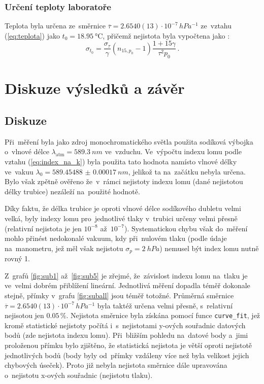 \documentclass{../concepts/titul_zprava_p/prepareprotokolZprava} %
\begin{document}
\subsubsection{Určení teploty laboratoře}

Teplota byla určena ze~směrnice $\overline{\tau} = 2.6540(13)\cdot10^{-7}\,\unit{hPa^{-1}}$ ze~vztahu (\ref{eq:teplota})
jako $t_0 = \qty{18.95}{\degreeCelsius}$, přičemž nejistota byla vypočtena jako \cite{englich}:
\begin{equation}
    \label{eq:sigma_teplota}
    \sigma_{t_0} = \frac{\sigma_\tau}{\gamma} \left( n_{15,p_0} - 1 \right) \frac{1+15\gamma}{\tau^2 p_0} \,.
\end{equation}


\section{Diskuze výsledků a závěr}
\subsection{Diskuze}
Při~měření byla jako zdroj monochromatického světla použita sodíková výbojka o~vlnové délce $\lambda_\mathrm{atm} = \qty{589.3}{nm}$
ve~vzduchu. Ve~výpočtu indexu lomu podle vztahu (\ref{eq:index_na_k}) byla použita tato hodnota namísto vlnové délky ve~vakuu
$\lambda_0 = \qty{589.45488(17)}{nm}$, jelikož ta na~začátku nebyla určena. Bylo však zpětně ověřeno že~v~rámci nejistoty indexu 
lomu (dané nejistotou délky trubice) nezáleží na~použité hodnotě.

Díky faktu, že délka trubice je oproti vlnové délce sodíkového dubletu velmi velká, byly indexy lomu pro~jednotlivé tlaky v~trubici
určeny velmi přesně (relativní nejistota je jen $10^{-8}$ až~$10^{-7}$). Systematickou chybu však do~měření mohlo přinést
nedokonalé vakuum, kdy při~nulovém tlaku (podle údaje na~manometru, jež měl však nejistotu $\sigma_p = \qty{2}{hPa}$) 
nemusel být index lomu nutně rovný 1.

Z~grafů \ref{fig:sub1} až~\ref{fig:sub5} je zřejmé, že~závislost indexu lomu na~tlaku je ve~velmi dobrém přiblížení lineární.
Jednotlivá měření dopadla téměř dokonale stejně, přímky v~grafu \ref{fig:suball} jsou téměř totožné. Průměrná směrnice \\
$\overline{\tau}=2.6540(13)\cdot10^{-7}\,\unit{hPa^{-1}}$ byla taktéž určena velmi přesně, s~relativní nejisotou jen
$0.05\,\%$. Nejistota směrnice byla získána pomocí funce \texttt{curve\_fit}, jež kromě statistické nejistoty počítá
i~s~nejistotami y-ových souřadnic datových bodů (zde nejistota indexu lomu). Při~bližším pohledu na~datové body a~jimi 
proloženou přímku bylo zjištěno,
že statistická nejistota je větší oproti nejistotě jednotlivých bodů (body byly od~přímky vzdáleny více než byla velikost
jejich chybových úseček). Proto již nebyla nejistota směrnice dále upravována o~nejistotu x-ových souřadnic (nejistotu tlaku).
\end{document}
